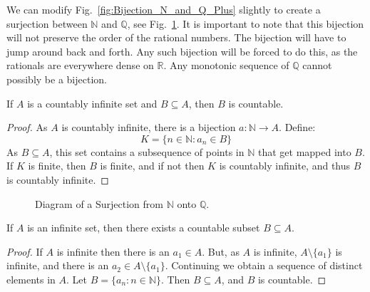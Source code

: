             We can modify Fig.~\ref{fig:Bijection_N_and_Q_Plus}
            slightly to create a surjection between $\mathbb{N}$
            and $\mathbb{Q}$, see
            Fig.~\ref{fig:Bijection_N_and_Q}.
            It is important to note that this bijection will not
            preserve the order of the rational numbers. The
            bijection will have to jump around back and forth.
            Any such bijection will be forced to do this, as the
            rationals are everywhere dense on $\mathbb{R}$. Any
            monotonic sequence of $\mathbb{Q}$ cannot possibly
            be a bijection.
            \begin{theorem}
                If $A$ is a countably infinite set and
                $B\subseteq{A}$, then $B$ is countable.
            \end{theorem}
            \begin{proof}
                As $A$ is countably infinite, there is a bijection
                $a:\mathbb{N}\rightarrow{A}$. Define:
                \begin{equation}
                    K=\{n\in\mathbb{N}:a_{n}\in{B}\}
                \end{equation}
                As $B\subseteq{A}$,
                this set contains a subsequence of points in
                $\mathbb{N}$ that get mapped into $B$. If $K$ is finite,
                then $B$ is finite, and if not then $K$ is countably
                infinite, and thus $B$ is countably infinite.
            \end{proof}
            \begin{figure}[H]
                \centering
                \captionsetup{type=figure}
                \resizebox{\textwidth}{!}{%
                    
                }
                \caption{Diagram of a Surjection from
                         $\mathbb{N}$ onto $\mathbb{Q}$.}
                \label{fig:Bijection_N_and_Q}
            \end{figure}
            \begin{theorem}
                If $A$ is an infinite set, then there exists a
                countable subset $B\subseteq{A}$.
            \end{theorem}
            \begin{proof}
                If $A$ is infinite then there is an
                $a_{1}\in{A}$. But, as $A$ is infinite,
                $A\setminus\{a_{1}\}$ is infinite, and there
                is an $a_{2}\in{A}\setminus\{a_{1}\}$. Continuing
                we obtain a sequence of distinct elements in $A$.
                Let $B=\{a_{n}:n\in\mathbb{N}\}$. Then
                $B\subseteq{A}$, and $B$ is countable.
            \end{proof}
